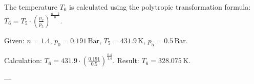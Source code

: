 The temperature \( T_6 \) is calculated using the polytropic transformation formula:  
\( T_6 = T_5 \cdot \left( \frac{p_2}{p_5} \right)^{\frac{n-1}{n}} \).  

Given:  
\( n = 1.4 \), \( p_0 = 0.191 \, \text{Bar} \), \( T_5 = 431.9 \, \text{K} \), \( p_5 = 0.5 \, \text{Bar} \).  

Calculation:  
\( T_6 = 431.9 \cdot \left( \frac{0.191}{0.5} \right)^{\frac{0.4}{1.4}} \).  
Result: \( T_6 = 328.075 \, \text{K} \).

---